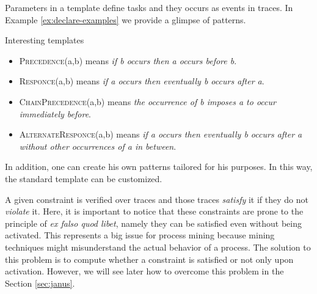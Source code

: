 Parameters in a template define tasks and they occurs as events in traces. In Example \ref{ex:declare-examples} we provide a glimpse of \declare patterns.
\begin{example}\label{ex:declare-examples}
Interesting \declare templates \citep{maggi2013knowledge}
\begin{itemize}
\item \textsc{Precedence}(a,b) means \emph{if b occurs then a occurs before b}.
\item \textsc{Responce}(a,b) means \emph{if a occurs then eventually b occurs after a}.
\item \textsc{ChainPrecedence}(a,b) means \emph{the occurrence of b imposes a to occur immediately before}.
\item \textsc{AlternateResponce}(a,b) means \emph{if a occurs then eventually
b occurs after a without other occurrences of a in between}.
\end{itemize}
\end{example}
In addition, one can create his own 	\declare patterns tailored for his purposes. In this way, the \declare standard template can be customized.

A given \declare constraint is verified over traces and those traces \emph{satisfy} it if they do not \emph{violate} it. Here, it is important to notice that these constraints are prone to the principle of \textit{ex falso quod libet}, namely they can be satisfied even without being activated. This represents a big issue for process mining because mining techniques might misunderstand the actual behavior of a process. The solution to this problem is to compute whether a constraint is satisfied or not only upon activation. However, we will see later how to overcome this problem in the Section \ref{sec:janus}.

